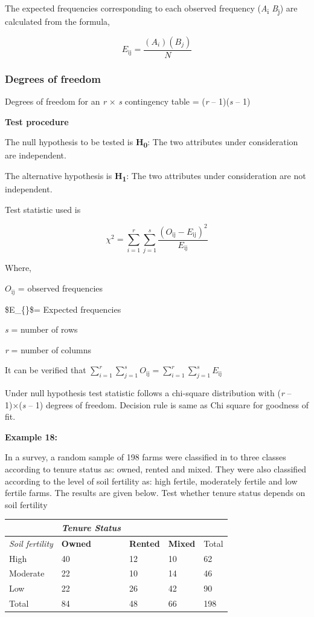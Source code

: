 \documentclass[
]{book}
\begin{document}
The expected frequencies corresponding to each observed frequency (\emph{A}\textsubscript{i} \emph{B}\textsubscript{j}) are calculated from the formula,

\[E_{\text{ij}} = \frac{\left( A_{i} \right)\left( B_{j} \right)}{N}\]

\hypertarget{degrees-of-freedom}{%
\subsubsection{Degrees of freedom}\label{degrees-of-freedom}}

Degrees of freedom for an \emph{r} × \emph{s} contingency table = (\emph{r} -- 1)(\emph{s} -- 1)

\textbf{Test procedure}

The null hypothesis to be tested is \textbf{H\textsubscript{0}}: The two attributes under consideration are independent.

The alternative hypothesis is \textbf{H\textsubscript{1}}: The two attributes under consideration are not independent.

Test statistic used is

\[\chi^{2} = \sum_{i = 1}^{r}{\sum_{j = 1}^{s}\frac{\left( O_{\text{ij}} - E_{\text{ij}} \right)^{2}}{E_{\text{ij}}}}\]

Where,

\(O_{\text{ij}}\) = observed frequencies

\$E\_\{\}\$= Expected frequencies

\emph{s} = number of rows

\emph{r} = number of columns

It can be verified that \(\sum_{i = 1}^{r}{\sum_{j = 1}^{s}O_{\text{ij}}} = \sum_{i = 1}^{r}{\sum_{j = 1}^{s}E_{\text{ij}}}\)

Under null hypothesis test statistic follows a chi-square distribution with (\emph{r} -- 1)×(\emph{s} -- 1) degrees of freedom. Decision rule is same as Chi square for goodness of fit.

\textbf{Example 18:}

In a survey, a random sample of 198 farms were classified in to three classes according to tenure status as: owned, rented and mixed. They were also classified according to the level of soil fertility as: high fertile, moderately fertile and low fertile farms. The results are given below. Test whether tenure status depends on soil fertility

\begin{longtable}[]{@{}lllll@{}}
\toprule\noalign{}
& \emph{Tenure Status} & & & \\
\midrule\noalign{}
\endhead
\bottomrule\noalign{}
\endlastfoot
\emph{Soil fertility} & \textbf{Owned} & \textbf{Rented} & \textbf{Mixed} & Total \\
High & 40 & 12 & 10 & 62 \\
Moderate & 22 & 10 & 14 & 46 \\
Low & 22 & 26 & 42 & 90 \\
Total & 84 & 48 & 66 & 198 \\
\end{longtable}
\end{document}
